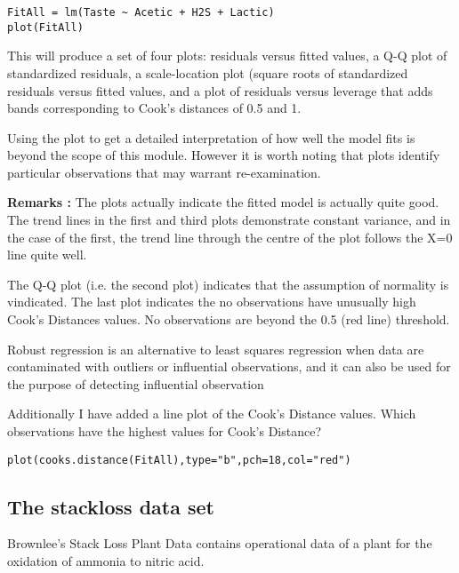 \begin{framed}
\begin{verbatim}
FitAll = lm(Taste ~ Acetic + H2S + Lactic)
plot(FitAll)
\end{verbatim}
\end{framed}
This will produce a set of four plots: residuals versus fitted values, a Q-Q plot of standardized residuals, a scale-location plot (square roots of standardized residuals versus fitted values, and a plot of residuals versus leverage that adds bands corresponding to Cook's distances of 0.5 and 1. 

Using the plot to get a detailed interpretation of how well the model fits is beyond the scope of this module. However it is worth noting that plots identify particular observations that may warrant re-examination. 

\textbf{Remarks :} 
The plots actually indicate the fitted model is actually quite good. The trend lines in the first and third plots demonstrate constant variance, and in the case of the first, the trend line through the centre of the plot  follows the X=0 line quite well.

The Q-Q plot (i.e. the second plot) indicates that the assumption of normality is vindicated.
The last plot indicates the no observations have unusually high Cook’s Distances values.  No observations are beyond the 0.5 (red line) threshold.

Robust regression is an alternative to least squares regression when data are contaminated with outliers or influential observations, and it can also be used for the purpose of detecting influential observation


Additionally I have added a line plot of the Cook’s Distance values. Which observations have the highest values for Cook’s Distance?

\begin{framed}
\begin{verbatim}
plot(cooks.distance(FitAll),type="b",pch=18,col="red")
\end{verbatim}
\end{framed}





\subsection{The stackloss data set}
Brownlee's Stack Loss Plant Data contains operational data of a plant for the oxidation of ammonia to nitric acid.

